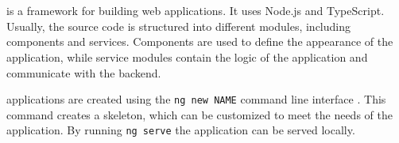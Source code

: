 \section{\angular{}}\label{sec:FE_angular}

\angular{} is a framework for building web applications.
It uses Node.js and TypeScript.
Usually, the source code is structured into different modules, including components and services.
Components are used to define the appearance of the application, while
service modules contain the logic of the application and communicate with the backend.

\angular{} applications are created using the \texttt{ng new NAME} command line interface \cite{angular_book2018}.
This command creates a skeleton, which can be customized to meet the needs of the application.
By running \texttt{ng serve} the application can be served locally.